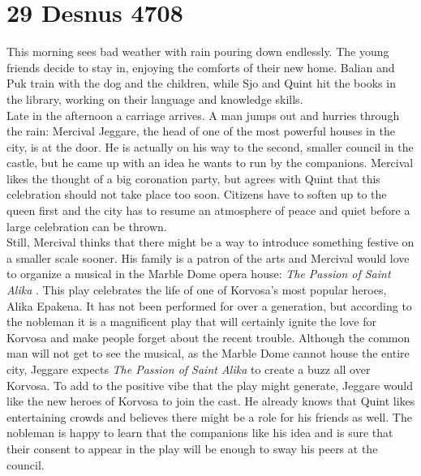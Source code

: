 \section{29 Desnus 4708}

This morning sees bad weather with rain pouring down endlessly. The young friends decide to stay in, enjoying the comforts of their new home. Balian and Puk train with the dog and the children, while Sjo and Quint hit the books in the library, working on their language and knowledge skills.\\

Late in the afternoon a carriage arrives. A man jumps out and hurries through the rain: Mercival Jeggare, the head of one of the most powerful houses in the city, is at the door. He is actually on his way to the second, smaller council in the castle, but he came up with an idea he wants to run by the companions. Mercival likes the thought of a big coronation party, but agrees with Quint that this celebration should not take place too soon. Citizens have to soften up to the queen first and the city has to resume an atmosphere of peace and quiet before a large celebration can be thrown.\\

Still, Mercival thinks that there might be a way to introduce something festive on a smaller scale sooner. His family is a patron of the arts and Mercival would love to organize a musical in the Marble Dome opera house: {\itshape The Passion of Saint Alika} . This play celebrates the life of one of Korvosa's most popular heroes, Alika Epakena. It has not been performed for over a generation, but according to the nobleman it is a magnificent play that will certainly ignite the love for Korvosa and make people forget about the recent trouble. Although the common man will not get to see the musical, as the Marble Dome cannot house the entire city, Jeggare expects  {\itshape The Passion of Saint Alika} to create a buzz all over Korvosa. To add to the positive vibe that the play might generate, Jeggare would like the new heroes of Korvosa to join the cast. He already knows that Quint likes entertaining crowds and believes there might be a role for his friends as well. The nobleman is happy to learn that the companions like his idea and is sure that their consent to appear in the play will be enough to sway his peers at the council.\\

